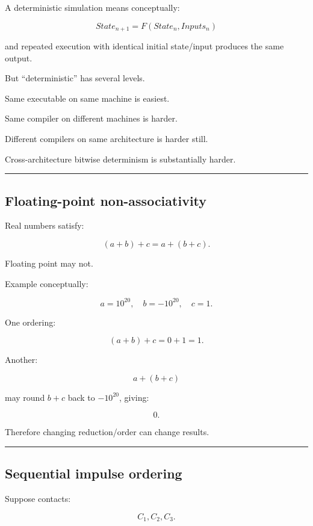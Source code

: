 A deterministic simulation means conceptually:

\[
\boxed{
State_{n+1}
=
F(State_n,Inputs_n)
}
\]

and repeated execution with identical initial state/input produces the same output.

But ``deterministic'' has several levels.

Same executable on same machine is easiest.

Same compiler on different machines is harder.

Different compilers on same architecture is harder still.

Cross-architecture bitwise determinism is substantially harder.

\begin{center}\rule{0.5\linewidth}{0.5pt}\end{center}

\subsection{Floating-point non-associativity}\label{06-engine-ii-ch039-floating-point-non-associativity}

Real numbers satisfy:

\[
(a+b)+c
=
a+(b+c).
\]

Floating point may not.

Example conceptually:

\[
a=10^{20},
\quad
b=-10^{20},
\quad
c=1.
\]

One ordering:

\[
(a+b)+c
=
0+1
=
1.
\]

Another:

\[
a+(b+c)
\]

may round \(b+c\) back to \(-10^{20}\), giving:

\[
0.
\]

Therefore changing reduction/order can change results.

\begin{center}\rule{0.5\linewidth}{0.5pt}\end{center}

\subsection{Sequential impulse ordering}\label{06-engine-ii-ch039-sequential-impulse-ordering}

Suppose contacts:

\[
C_1,C_2,C_3.
\]

